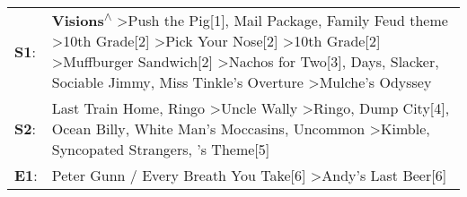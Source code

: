 \begin{supertabular}{p{0.03\textwidth}p{0.92\textwidth}}
 \textbf{S1}:  &  \textbf{Visions\textsuperscript{$\wedge$}} \textgreater \enspace Push the Pig[1]\textsuperscript{}, \enspace Mail Package\textsuperscript{}, \enspace Family Feud theme\textsuperscript{} \textgreater \enspace 10th Grade[2]\textsuperscript{} \textgreater \enspace Pick Your Nose[2]\textsuperscript{} \textgreater \enspace 10th Grade[2]\textsuperscript{} \textgreater \enspace Muffburger Sandwich[2]\textsuperscript{} \textgreater \enspace Nachos for Two[3]\textsuperscript{},  Days\textsuperscript{}, \enspace Slacker\textsuperscript{}, \enspace Sociable Jimmy\textsuperscript{}, \enspace Miss Tinkle's Overture\textsuperscript{} \textgreater \enspace Mulche's Odyssey\textsuperscript{}  \enspace  \\
 \textbf{S2}:  &                                                                                                                                                                                                                                  Last Train Home\textsuperscript{}, \enspace Ringo\textsuperscript{} \textgreater \enspace Uncle Wally\textsuperscript{} \textgreater \enspace Ringo\textsuperscript{}, \enspace Dump City[4]\textsuperscript{}, \enspace Ocean Billy\textsuperscript{}, \enspace White Man's Moccasins\textsuperscript{}, \enspace Uncommon\textsuperscript{} \textgreater \enspace Kimble\textsuperscript{}, \enspace Syncopated Strangers\textsuperscript{}, 's Theme[5]\textsuperscript{}  \enspace  \\
 \textbf{E1}:  &                                                                                                                                                                                                                                                                                                                                                                                                                                                                                                                                                                                                      Peter Gunn / Every Breath You Take[6]\textsuperscript{} \textgreater \enspace Andy's Last Beer[6]\textsuperscript{}  \enspace  \\
\end{supertabular}

